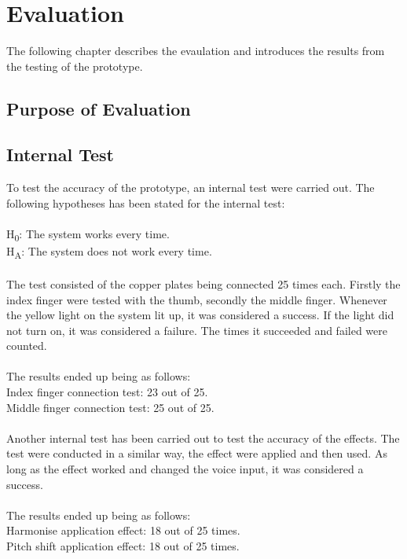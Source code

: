 \chapter{Evaluation}

The following chapter describes the evaulation and introduces the results from the testing of the prototype. 

\section{Purpose of Evaluation}



\section{Internal Test}

To test the accuracy of the prototype, an internal test were carried out. The following hypotheses has been stated for the internal test: \\\\
H\textsubscript{0}: The system works every time.\\
H\textsubscript{A}: The system does not work every time.\\\\

The test consisted of the copper plates being connected 25 times each. Firstly the index finger were tested with the thumb, secondly the middle finger. Whenever the yellow light on the system
lit up, it was considered a success. If the light did not turn on, it was considered a failure. The times it succeeded and failed were counted.\\\\

The results ended up being as follows:\\
Index finger connection test: 23 out of 25. \\
Middle finger connection test: 25 out of 25.\\\\

Another internal test has been carried out to test the accuracy of the effects. The test were conducted in a similar way, the effect were applied and then used. 
As long as the effect worked and changed the voice input, it was considered a success. \\\\

The results ended up being as follows:\\
Harmonise application effect: 18 out of 25 times. \\
Pitch shift application effect: 18 out of 25 times. \\\\

